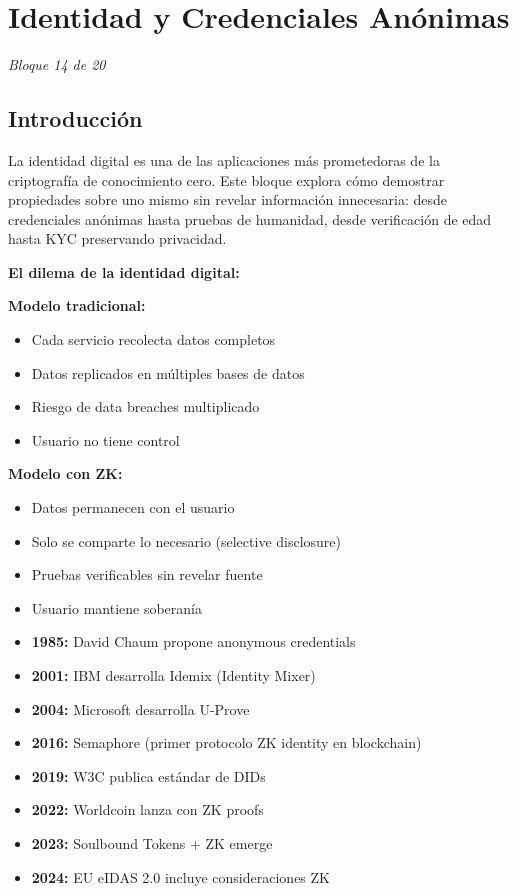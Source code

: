\documentclass[11pt,a4paper,twoside]{book}
\theoremstyle{definition}
\theoremstyle{remark}
\begin{document}
\chapter{Identidad y Credenciales Anónimas}
\label{ch:bloque14}

\begin{center}
\textit{Bloque 14 de 20}
\end{center}

\section*{Introducción}

La identidad digital es una de las aplicaciones más prometedoras de la criptografía de conocimiento cero. Este bloque explora cómo demostrar propiedades sobre uno mismo sin revelar información innecesaria: desde credenciales anónimas hasta pruebas de humanidad, desde verificación de edad hasta KYC preservando privacidad.

\begin{keyidea}
\textbf{El dilema de la identidad digital:}

\textbf{Modelo tradicional:}
\begin{itemize}
    \item Cada servicio recolecta datos completos
    \item Datos replicados en múltiples bases de datos
    \item Riesgo de data breaches multiplicado
    \item Usuario no tiene control
\end{itemize}

\textbf{Modelo con ZK:}
\begin{itemize}
    \item Datos permanecen con el usuario
    \item Solo se comparte lo necesario (selective disclosure)
    \item Pruebas verificables sin revelar fuente
    \item Usuario mantiene soberanía
\end{itemize}
\end{keyidea}

\begin{mathnote}
\begin{itemize}
    \item \textbf{1985:} David Chaum propone anonymous credentials
    \item \textbf{2001:} IBM desarrolla Idemix (Identity Mixer)
    \item \textbf{2004:} Microsoft desarrolla U-Prove
    \item \textbf{2016:} Semaphore (primer protocolo ZK identity en blockchain)
    \item \textbf{2019:} W3C publica estándar de DIDs
    \item \textbf{2022:} Worldcoin lanza con ZK proofs
    \item \textbf{2023:} Soulbound Tokens + ZK emerge
    \item \textbf{2024:} EU eIDAS 2.0 incluye consideraciones ZK
\end{itemize}
\end{mathnote}
\end{document}
